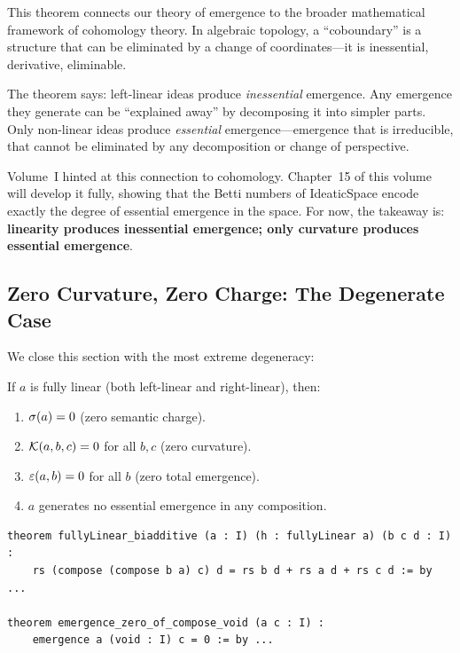 \begin{interpretation}
This theorem connects our theory of emergence to the broader mathematical
framework of cohomology theory. In algebraic topology, a ``coboundary'' is a
structure that can be eliminated by a change of coordinates---it is
inessential, derivative, eliminable.

The theorem says: left-linear ideas produce \emph{inessential} emergence. Any
emergence they generate can be ``explained away'' by decomposing it into
simpler parts. Only non-linear ideas produce \emph{essential} emergence---emergence
that is irreducible, that cannot be eliminated by any decomposition or change
of perspective.

Volume~I hinted at this connection to cohomology. Chapter~15 of this volume
will develop it fully, showing that the Betti numbers of IdeaticSpace encode
exactly the degree of essential emergence in the space. For now, the takeaway
is: \textbf{linearity produces inessential emergence; only curvature produces
essential emergence}.
\end{interpretation}

\subsection{Zero Curvature, Zero Charge: The Degenerate Case}

We close this section with the most extreme degeneracy:

\begin{theorem}
\label{thm:fully-linear-complete-flat}
If $a$ is fully linear (both left-linear and right-linear), then:
\begin{enumerate}
  \item $\sigma(a) = 0$ (zero semantic charge).
  \item $\mathcal{K}(a, b, c) = 0$ for all $b, c$ (zero curvature).
  \item $\varepsilon(a, b) = 0$ for all $b$ (zero total emergence).
  \item $a$ generates no essential emergence in any composition.
\end{enumerate}
\end{theorem}

\begin{lstlisting}[caption={Full linearity (IDT\_v3\_Emergence.lean)}]
theorem fullyLinear_biadditive (a : I) (h : fullyLinear a) (b c d : I) :
    rs (compose (compose b a) c) d = rs b d + rs a d + rs c d := by ...

theorem emergence_zero_of_compose_void (a c : I) :
    emergence a (void : I) c = 0 := by ...
\end{lstlisting}

